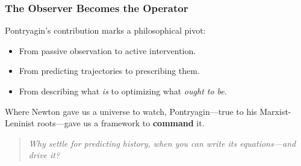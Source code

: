 \subsubsection*{The Observer Becomes the Operator}

Pontryagin’s contribution marks a philosophical pivot:

\begin{itemize}
  \item From passive observation to active intervention.
  \item From predicting trajectories to prescribing them.
  \item From describing what \textit{is} to optimizing what \textit{ought to be}.
\end{itemize}

Where Newton gave us a universe to watch, Pontryagin—true to his Marxist-Leninist roots—gave us a framework to \textbf{command} it.

\begin{quote}
\emph{Why settle for predicting history, when you can write its equations—and drive it?}
\end{quote}


